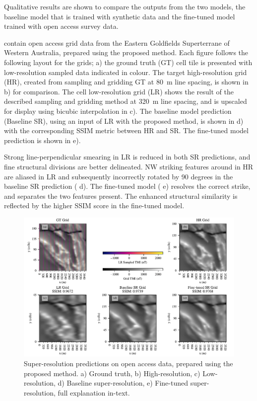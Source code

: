 Qualitative results are shown to compare the outputs from the two models, the baseline model that is trained with synthetic data and the fine-tuned model trained with open access survey data.

 contain open access grid data from the Eastern Goldfields Superterrane of Western Australia, prepared using the proposed method.
Each figure follows the following layout for the grids; a) the ground truth (GT)  cell tile is presented with low-resolution sampled data indicated in colour.
The target high-resolution grid (HR), created from sampling and gridding GT at \qty{80}{\m} line spacing, is shown in b) for comparison.
The  cell low-resolution grid (LR) shows the result of the described sampling and gridding method at \qty{320}{m} line spacing, and is upscaled for display using bicubic interpolation in c).
The baseline model prediction (Baseline SR), using an input of LR with the proposed method, is shown in d) with the corresponding SSIM metric between HR and SR\@.
The fine-tuned model prediction is shown in e).

Strong line-perpendicular smearing in LR is reduced in both SR predictions, and fine structural divisions are better delineated.
NW striking features around in HR are aliased in LR and subsequently incorrectly rotated by 90 degrees in the baseline SR prediction ( d).
The fine-tuned model ( e) resolves the correct strike, and separates the two features present.
The enhanced structural similarity is reflected by the higher SSIM score in the fine-tuned model.

\begin{landscape}
    \begin{figure}[hbtp]
        \centering
        \includegraphics[width=1\linewidth]{fig/p2/srcomp_23.pdf}
        \caption[Super-resolution geophysics grid results I]{Super-resolution predictions on open access data, prepared using the proposed method.
            a) Ground truth, b) High-resolution, c) Low-resolution, d) Baseline super-resolution, e) Fine-tuned super-resolution, full explanation in-text.
        }  
        \label{fig:srdata23}
    \end{figure}
\end{landscape}

